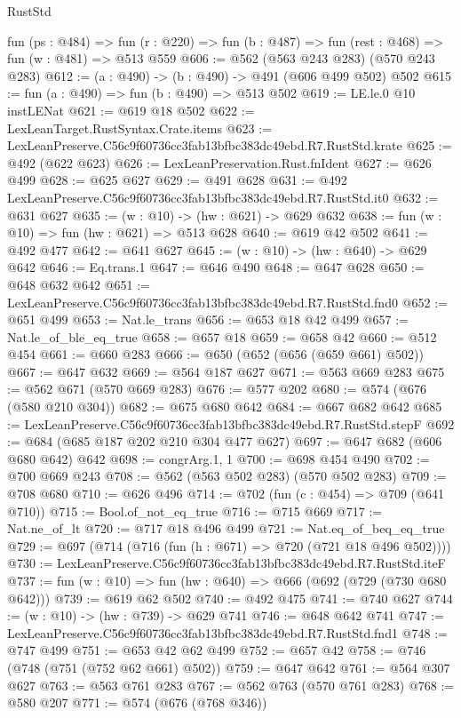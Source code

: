 \begin{lexlean}{RustStd}
\begin{coremodule}
  fun (ps : @484) =>
  fun (r : @220) => fun (b : @487) => fun (rest : @468) => fun (w : @481) => @513 @559
@606 := @562 (@563 @243 @283) (@570 @243 @283)
@612 := (a : @490) -> (b : @490) -> @491 (@606 @499 @502) @502
@615 := fun (a : @490) => fun (b : @490) => @513 @502
@619 := LE.le.{0} @10 instLENat
@621 := @619 @18 @502
@622 := LexLeanTarget.RustSyntax.Crate.items
@623 := LexLeanPreserve.C56c9f60736cc3fab13bfbc383dc49ebd.R7.RustStd.krate
@625 := @492 (@622 @623)
@626 := LexLeanPreservation.Rust.fnIdent
@627 := @626 @499
@628 := @625 @627
@629 := @491 @628
@631 := @492 LexLeanPreserve.C56c9f60736cc3fab13bfbc383dc49ebd.R7.RustStd.it0
@632 := @631 @627
@635 := (w : @10) -> (hw : @621) -> @629 @632
@638 := fun (w : @10) => fun (hw : @621) => @513 @628
@640 := @619 @42 @502
@641 := @492 @477
@642 := @641 @627
@645 := (w : @10) -> (hw : @640) -> @629 @642
@646 := Eq.trans.{1}
@647 := @646 @490
@648 := @647 @628
@650 := @648 @632 @642
@651 := LexLeanPreserve.C56c9f60736cc3fab13bfbc383dc49ebd.R7.RustStd.fnd0
@652 := @651 @499
@653 := Nat.le_trans
@656 := @653 @18 @42 @499
@657 := Nat.le_of_ble_eq_true
@658 := @657 @18
@659 := @658 @42
@660 := @512 @454
@661 := @660 @283
@666 := @650 (@652 (@656 (@659 @661) @502))
@667 := @647 @632
@669 := @564 @187 @627
@671 := @563 @669 @283
@675 := @562 @671 (@570 @669 @283)
@676 := @577 @202
@680 := @574 (@676 (@580 @210 @304))
@682 := @675 @680 @642
@684 := @667 @682 @642
@685 := LexLeanPreserve.C56c9f60736cc3fab13bfbc383dc49ebd.R7.RustStd.stepF
@692 := @684 (@685 @187 @202 @210 @304 @477 @627)
@697 := @647 @682 (@606 @680 @642) @642
@698 := congrArg.{1, 1}
@700 := @698 @454 @490
@702 := @700 @669 @243
@708 := @562 (@563 @502 @283) (@570 @502 @283)
@709 := @708 @680
@710 := @626 @496
@714 := @702 (fun (c : @454) => @709 (@641 @710))
@715 := Bool.of_not_eq_true
@716 := @715 @669
@717 := Nat.ne_of_lt
@720 := @717 @18 @496 @499
@721 := Nat.eq_of_beq_eq_true
@729 := @697 (@714 (@716 (fun (h : @671) => @720 (@721 @18 @496 @502))))
@730 := LexLeanPreserve.C56c9f60736cc3fab13bfbc383dc49ebd.R7.RustStd.iteF
@737 := fun (w : @10) => fun (hw : @640) => @666 (@692 (@729 (@730 @680 @642)))
@739 := @619 @62 @502
@740 := @492 @475
@741 := @740 @627
@744 := (w : @10) -> (hw : @739) -> @629 @741
@746 := @648 @642 @741
@747 := LexLeanPreserve.C56c9f60736cc3fab13bfbc383dc49ebd.R7.RustStd.fnd1
@748 := @747 @499
@751 := @653 @42 @62 @499
@752 := @657 @42
@758 := @746 (@748 (@751 (@752 @62 @661) @502))
@759 := @647 @642
@761 := @564 @307 @627
@763 := @563 @761 @283
@767 := @562 @763 (@570 @761 @283)
@768 := @580 @207
@771 := @574 (@676 (@768 @346))

\end{coremodule}
\end{lexlean}
